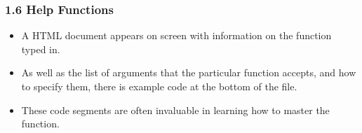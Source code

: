 \documentclass{beamer}
\begin{document}
 \begin{frame}
 	
 	\frametitle{1.6 Help Functions}
 	\begin{itemize}
 		\item A HTML document appears on screen with information on the function typed in. 
 		\item As well
 		as the list of arguments that the particular function accepts, and how to specify them, there is
 		example code at the bottom of the file. 
 		\item These code segments are often invaluable in learning
 		how to master the function.
 	\end{itemize}
 	
 	
 \end{frame}
\end{document}
